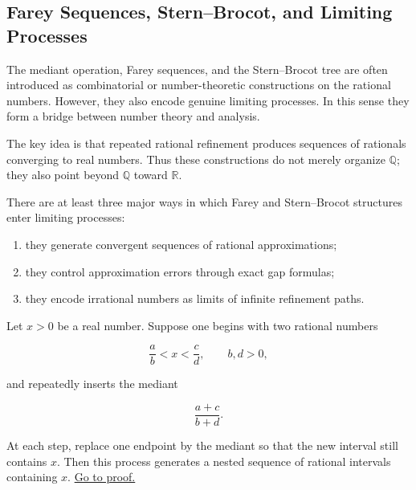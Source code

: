
\subsection{Farey Sequences, Stern--Brocot, and Limiting Processes}
\label{sec:sb-limiting-processes}

The mediant operation, Farey sequences, and the Stern--Brocot tree are
often introduced as combinatorial or number-theoretic constructions on
the rational numbers.  However, they also encode genuine limiting
processes.  In this sense they form a bridge between number theory and
analysis.

The key idea is that repeated rational refinement produces sequences of
rationals converging to real numbers.  Thus these constructions do not
merely organize $\mathbb{Q}$; they also point beyond $\mathbb{Q}$ toward
$\mathbb{R}$.

\begin{remark}
There are at least three major ways in which Farey and Stern--Brocot
structures enter limiting processes:

\begin{enumerate}
\item they generate convergent sequences of rational approximations;
\item they control approximation errors through exact gap formulas;
\item they encode irrational numbers as limits of infinite refinement
paths.
\end{enumerate}

\end{remark}


\begin{theorem}
\label{thm:stern-brocot-refinement}

Let $x>0$ be a real number.  Suppose one begins with two rational
numbers

\[
\frac{a}{b} < x < \frac{c}{d},
\qquad b,d>0,
\]

and repeatedly inserts the mediant

\[
\frac{a+c}{b+d}.
\]

At each step, replace one endpoint by the mediant so that the new
interval still contains $x$.  Then this process generates a nested
sequence of rational intervals containing $x$.
\hyperref[prf:stern-brocot-refinement]{Go to proof.}
\end{theorem}

